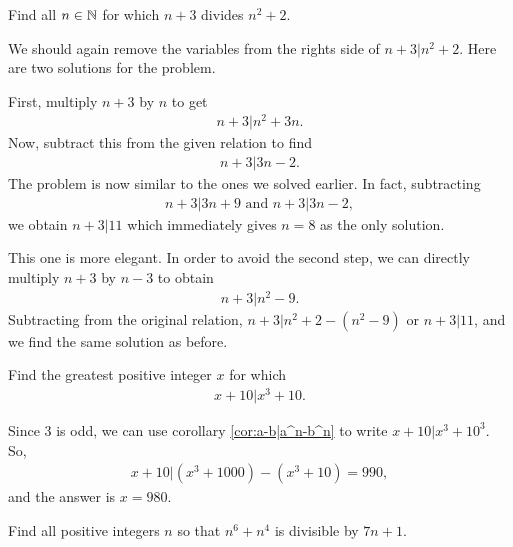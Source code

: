 \documentclass{subfile}
\begin{document}
		\begin{problem}\label{prob:n+3|n^2+2}
			Find all $n\in\mathbb{N}$ for which $n+3$ divides $n^2+2$.
		\end{problem}
	We should again remove the variables from the rights side of $n+3|n^2+2$. Here are two solutions for the problem.
		\begin{solution}
			 First, multiply $n+3$ by $n$ to get
				\begin{align*}
					n+3|n^2+3n.
				\end{align*}
			Now, subtract this from the given relation to find
				\begin{align*}
					n+3|3n-2.
				\end{align*}
			The problem is now similar to the ones we solved earlier. In fact, subtracting
				\begin{align*}
					n+3|3n+9 \text{ and } n+3|3n-2,
				\end{align*}
			we obtain $n+3|11$ which immediately gives $n=8$ as the only solution.
		\end{solution}

		\begin{solution}
			This one is more elegant. In order to avoid the second step, we can directly multiply $n+3$ by $n-3$ to obtain
			\begin{align*}
				n+3  |n^2-9.
			\end{align*}
			Subtracting from the original relation, $n+3|n^2+2-(n^2-9)$ or $n+3|11$, and we find the same solution as before.
		\end{solution}

		\begin{problem}
			Find the greatest positive integer $x$ for which
				\begin{align*}
					x+10|x^3+10.
				\end{align*}
		\end{problem}

		\begin{solution}
			Since $3$ is odd, we can use corollary \eqref{cor:a-b|a^n-b^n} to write $x+10|x^3+10^3$. So,
				\begin{align*}
					x+10|(x^3+1000)-(x^3+10)=990,
				\end{align*}
			and the answer is $x=980$.
		\end{solution}

		\begin{problem}
			Find all positive integers $n$ so that $n^6+n^4$ is divisible by $7n+1$.
		\end{problem}
\end{document}
